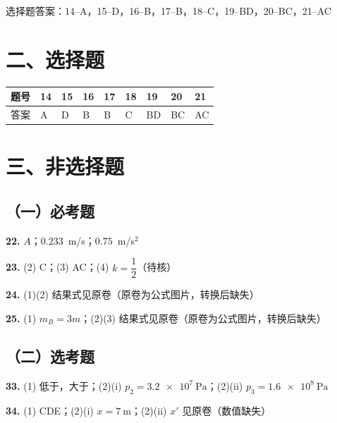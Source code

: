 
\begin{gknotice}
  选择题答案：14--A，15--D，16--B，17--B，18--C，19--BD，20--BC，21--AC
\end{gknotice}

\section*{二、选择题}

\noindent
\begin{tabular}{@{}lllllllll@{}}
\toprule
题号 & 14 & 15 & 16 & 17 & 18 & 19 & 20 & 21\\
\midrule
答案 & A & D & B & B & C & BD & BC & AC\\
\bottomrule
\end{tabular}

\section*{三、非选择题}

\subsection*{（一）必考题}

\noindent
\textbf{22.} $A$；$0.233$~m/s；$0.75$~m/s$^{2}$

\smallskip

\noindent
\textbf{23.} (2) C；\quad(3) AC；\quad(4) $k=\dfrac{1}{2}$（待核）

\smallskip

\noindent
\textbf{24.} (1)(2) 结果式见原卷（原卷为公式图片，转换后缺失）

\smallskip

\noindent
\textbf{25.} (1) $m_{B}=3m$；(2)(3) 结果式见原卷（原卷为公式图片，转换后缺失）

\subsection*{（二）选考题}

\noindent
\textbf{33.} (1) 低于，大于；\quad(2)(i) $p_{2}=\SI{3.2e7}{\pascal}$；\quad(2)(ii) $p_{3}=\SI{1.6e8}{\pascal}$

\smallskip

\noindent
\textbf{34.} (1) CDE；\quad(2)(i) $x=\SI{7}{\metre}$；\quad(2)(ii) $x'$ 见原卷（数值缺失）
